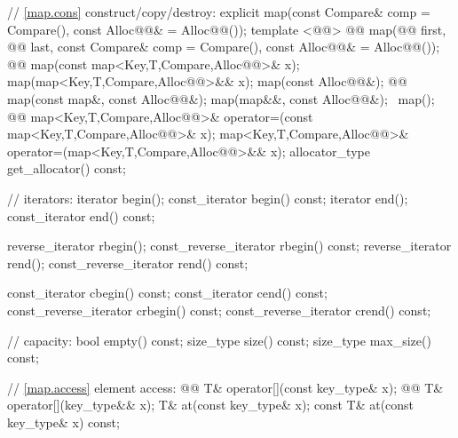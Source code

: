 \documentclass[american,twoside]{book}
\begin{document}
\begin{codeblock}
{{    // \ref{map.cons} construct/copy/destroy:
    explicit map(const Compare& comp = Compare(),
                 const Alloc@@& = Alloc@@());
    template <@@>
      @@
      map(@@ first, @@ last,
          const Compare& comp = Compare(), const Alloc@@& = Alloc@@());
    @@ 
      map(const map<Key,T,Compare,Alloc@@>& x);
    map(map<Key,T,Compare,Alloc@@>&& x);
    map(const Alloc@@&);
    @@ 
      map(const map&, const Alloc@@&);
    map(map&&, const Alloc@@&);
   ~map();
    @@
      map<Key,T,Compare,Alloc@@>& operator=(const map<Key,T,Compare,Alloc@@>& x);
    map<Key,T,Compare,Alloc@@>&
      operator=(map<Key,T,Compare,Alloc@@>&& x);
    allocator_type get_allocator() const;

    // iterators:
    iterator               begin();
    const_iterator         begin() const;
    iterator               end();
    const_iterator         end() const;

    reverse_iterator       rbegin();
    const_reverse_iterator rbegin() const;
    reverse_iterator       rend();
    const_reverse_iterator rend() const;

    const_iterator         cbegin() const;
    const_iterator         cend() const;
    const_reverse_iterator crbegin() const;
    const_reverse_iterator crend() const;

    // capacity:
    bool      empty() const;
    size_type size() const;
    size_type max_size() const;

    // \ref{map.access} element access:
    @@ T& operator[](const key_type& x);
    @@ T& operator[](key_type&& x);
    T&       at(const key_type& x);
    const T& at(const key_type& x) const;

}}
\end{codeblock}
\end{document}
